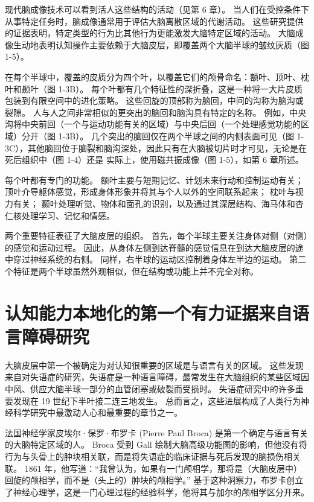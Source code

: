 现代脑成像技术可以看到活人这些结构的活动（见第 6 章）。 当人们在受控条件下从事特定任务时，脑成像通常用于评估大脑离散区域的代谢活动。 这些研究提供的证据表明，特定类型的行为比其他行为更能激发大脑特定区域的活动。 大脑成像生动地表明认知操作主要依赖于大脑皮层，即覆盖两个大脑半球的皱纹灰质（图 1-5）。

在每个半球中，覆盖的皮质分为四个叶，以覆盖它们的颅骨命名：额叶、顶叶、枕叶和颞叶（图 1-3B）。 每个叶都有几个特征性的深折叠，这是一种将一大片皮质包装到有限空间中的进化策略。 这些回旋的顶部称为脑回，中间的沟称为脑沟或裂隙。 人与人之间非常相似的更突出的脑回和脑沟具有特定的名称。 例如，中央沟将中央前回（一个与运动功能有关的区域）与中央后回（一个处理感觉功能的区域）分开（图 1-3B）。 几个突出的脑回仅在两个半球之间的内侧表面可见（图 1-3C），其他脑回位于脑裂和脑沟深处，因此只有在大脑被切片时才可见，无论是在死后组织中（图 1-4）还是 实际上，使用磁共振成像（图 1-5），如第 6 章所述。

每个叶都有专门的功能。 额叶主要与短期记忆、计划未来行动和控制运动有关； 顶叶介导躯体感觉，形成身体形象并将其与个人以外的空间联系起来； 枕叶与视力有关； 颞叶处理听觉、物体和面孔的识别，以及通过其深层结构、海马体和杏仁核处理学习、记忆和情感。

两个重要特征表征了大脑皮层的组织。 首先，每个半球主要关注身体对侧（对侧）的感觉和运动过程。 因此，从身体左侧到达脊髓的感觉信息在到达大脑皮层的途中穿过神经系统的右侧。 同样，右半球的运动区控制着身体左半边的运动。 第二个特征是两个半球虽然外观相似，但在结构或功能上并不完全对称。


\section{认知能力本地化的第一个有力证据来自语言障碍研究}

大脑皮层中第一个被确定为对认知很重要的区域是与语言有关的区域。 这些发现来自对失语症的研究，失语症是一种语言障碍，最常发生在大脑组织的某些区域因中风、供应大脑半球一部分的血管闭塞或破裂而受损时。 失语症研究中的许多重要发现在 19 世纪下半叶接二连三地发生。 总而言之，这些进展构成了人类行为神经科学研究中最激动人心和最重要的章节之一。

法国神经学家皮埃尔·保罗·布罗卡 (Pierre Paul Broca) 是第一个确定与语言有关的大脑特定区域的人。 Broca 受到 Gall 绘制大脑高级功能图的影响，但他没有将行为与头骨上的肿块相关联，而是将失语症的临床证据与死后发现的脑损伤相关联。 1861 年，他写道：“我曾认为，如果有一门颅相学，那将是（大脑皮层中）回旋的颅相学，而不是（头上的）肿块的颅相学。” 基于这种洞察力，布罗卡创立了神经心理学，这是一门心理过程的经验科学，他将其与加尔的颅相学区分开来。

